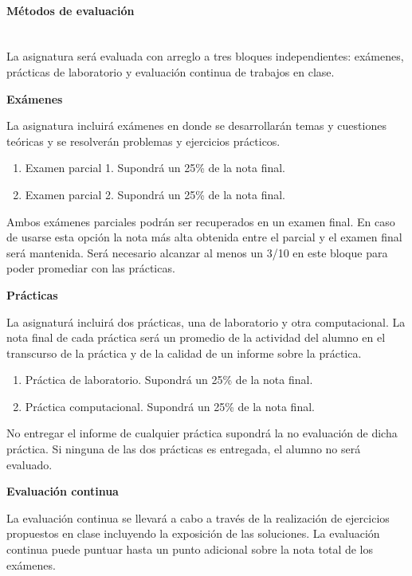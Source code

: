 \paragraph{Métodos de evaluación\\\\}

La asignatura será evaluada con arreglo a tres bloques independientes: exámenes, prácticas de laboratorio y evaluación continua de trabajos en clase.

\textbf{Exámenes}

La asignatura incluirá exámenes en donde se desarrollarán temas y cuestiones teóricas y se resolverán problemas y ejercicios prácticos.

\begin{enumerate}
    \item Examen parcial 1. Supondrá un 25\% de la nota final.
    \item Examen parcial 2. Supondrá un 25\% de la nota final.
\end{enumerate}

Ambos exámenes parciales podrán ser recuperados en un examen final. En caso de usarse esta opción la nota más alta obtenida entre el parcial y el examen final será mantenida. Será necesario alcanzar al menos un 3/10 en este bloque para poder promediar con las prácticas.

\textbf{Prácticas}

La asignaturá incluirá dos prácticas, una de laboratorio y otra computacional. La nota final de cada práctica será un promedio de la actividad del alumno en el transcurso de la práctica y de la calidad de un informe sobre la práctica. 

\begin{enumerate}
    \item Práctica de laboratorio. Supondrá un 25\% de la nota final.
    \item Práctica computacional. Supondrá un 25\% de la nota final.
\end{enumerate}

No entregar el informe de cualquier práctica supondrá la no evaluación de dicha práctica. Si ninguna de las dos prácticas es entregada, el alumno no será evaluado.

\textbf{Evaluación continua}

La evaluación continua se llevará a cabo a través de la realización de ejercicios propuestos en clase incluyendo la exposición de las soluciones. La evaluación continua puede puntuar hasta un punto adicional sobre la nota total de los exámenes.

